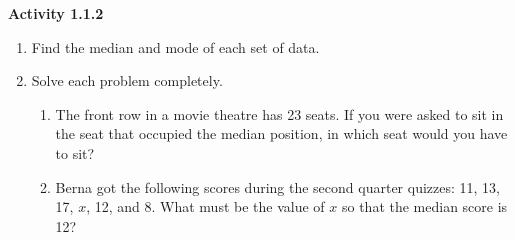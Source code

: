 \vspace{1ex}
\noindent\textbf{Activity 1.1.2}

\vspace{0.75ex}

\begin{enumerate}[label = \Alph*. ]
\item Find the median and mode of each set of data.
\begin{enumerate}[label = \arabic*. ]
\end{enumerate}  

\item Solve each problem completely. 
\begin{enumerate}[label = \arabic*. ]
\item The front row in a movie theatre has 23 seats. If you were asked to sit in the seat that occupied the median position, in which seat would you have to sit?
\item Berna got the following scores during the second  quarter quizzes: 11, 13, 17, $x$, 12, and 8. What must be the value of $x$ so that the median score is 12?

\end{enumerate}   

\end{enumerate} 